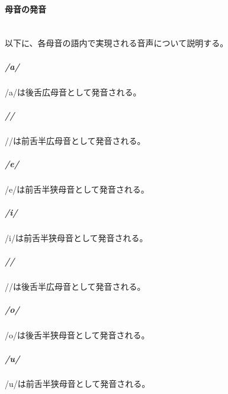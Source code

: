 \paragraph{母音の発音}\quad\\
以下に、各母音の語内で実現される音声について説明する。

\subparagraph{/a/}
/a/は後舌広母音\textipa{[A]}として発音される。

\subparagraph{//}
//は前舌半広母音\textipa{[E]}として発音される。

\subparagraph{/e/}
/e/は前舌半狭母音\textipa{[e]}として発音される。

\subparagraph{/i/}
/i/は前舌半狭母音\textipa{[i]}として発音される。

\subparagraph{//}
//は後舌半広母音\textipa{[O]}として発音される。

\subparagraph{/o/}
/o/は後舌半狭母音\textipa{[o]}として発音される。

\subparagraph{/u/}
/u/は前舌半狭母音\textipa{[u]}として発音される。


